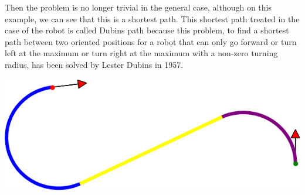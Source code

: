 \documentclass[11pt,a4paper]{article}
\begin{document}
	\begin{minipage}{0.8\textwidth}
	\raggedright
	Then the problem is no longer trivial in the general case, although on this example, we can see that this is a shortest path. This shortest path treated in the case of the robot is called Dubins path because this problem, to find a shortest path between two oriented positions for a robot that can only go forward or turn left at the maximum or turn right at the maximum with a non-zero turning radius, has been solved by Lester Dubins in 1957.
	\end{minipage}
	\begin{minipage}{0.2\textwidth}
	\includegraphics[width=\linewidth]{Illustrations/002Summary.png}
	\end{minipage}\\
	
\end{document}
